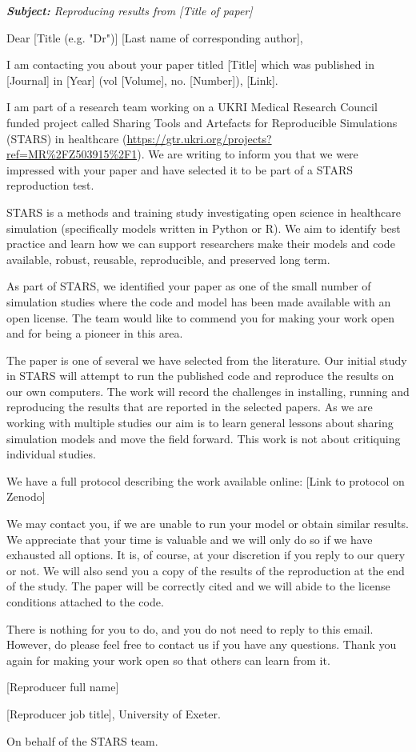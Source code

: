 \begin{adjustwidth}{1.2cm}{}
    \itshape
    \textbf{Subject:} Reproducing results from [Title of paper]

    Dear [Title (e.g. "Dr")] [Last name of corresponding author],
    
    I am contacting you about your paper titled [Title] which was published in [Journal] in [Year] (vol [Volume], no. [Number]), [Link].  

    I am part of a research team working on a UKRI Medical Research Council funded project called Sharing Tools and Artefacts for Reproducible Simulations (STARS) in healthcare (\url{https://gtr.ukri.org/projects?ref=MR%2FZ503915%2F1}). We are writing to inform you that we were impressed with your paper and have selected it to be part of a STARS reproduction test.  
    
    STARS is a methods and training study investigating open science in healthcare simulation (specifically models written in Python or R). We aim to identify best practice and learn how we can support researchers make their models and code available, robust, reusable, reproducible, and preserved long term.
    
    As part of STARS, we identified your paper as one of the small number of simulation studies where the code and model has been made available with an open license.  The team would like to commend you for making your work open and for being a pioneer in this area.
    
    The paper is one of several we have selected from the literature.  Our initial study in STARS will attempt to run the published code and reproduce the results on our own computers. The work will record the challenges in installing, running and reproducing the results that are reported in the selected papers.  As we are working with multiple studies our aim is to learn general lessons about sharing simulation models and move the field forward. This work is not about critiquing individual studies.  
    
    We have a full protocol describing the work available online: [Link to protocol on Zenodo]
    
    We may contact you, if we are unable to run your model or obtain similar results.  We appreciate that your time is valuable and we will only do so if we have exhausted all options.  It is, of course, at your discretion if you reply to our query or not.  We will also send you a copy of the results of the reproduction at the end of the study. The paper will be correctly cited and we will abide to the license conditions attached to the code.
    
    There is nothing for you to do, and you do not need to reply to this email. However, do please feel free to contact us if you have any questions. Thank you again for making your work open so that others can learn from it.
    
    [Reproducer full name]

    [Reproducer job title], University of Exeter.

    On behalf of the STARS team.
\end{adjustwidth}

